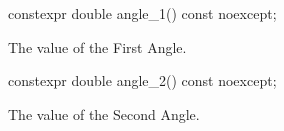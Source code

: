 \begin{itemdecl}
constexpr double angle_1() const noexcept;
\end{itemdecl}
\begin{itemdescr}
\pnum
\returns
The value of the First Angle.
\end{itemdescr}

\begin{itemdecl}
constexpr double angle_2() const noexcept;
\end{itemdecl}
\begin{itemdescr}
\pnum
\returns
The value of the Second Angle.
\end{itemdescr}
